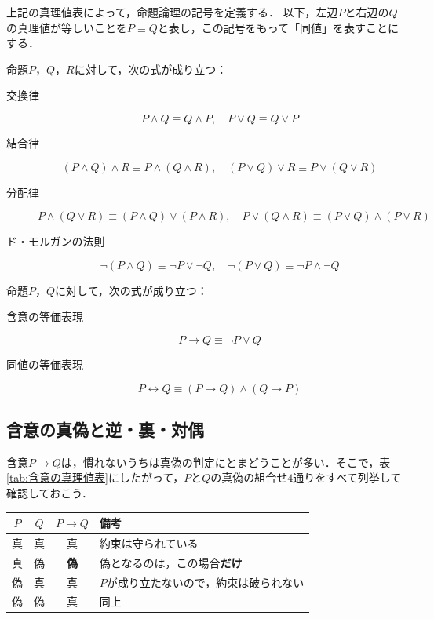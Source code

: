 上記の真理値表によって，命題論理の記号を定義する．
以下，左辺$P$と右辺の$Q$の真理値が等しいことを$P \equiv Q$と表し，この記号をもって「同値」を表すことにする．

\begin{prop}{}{}
  命題$P$，$Q$，$R$に対して，次の式が成り立つ：
  \begin{description}
    \item[交換律]
          \[
            P \land Q \equiv Q \land P,\quad
            P \lor Q \equiv Q \lor P
          \]
    \item[結合律]
          \[
            (P \land Q) \land R \equiv P \land (Q \land R),\quad
            (P \lor Q) \lor R \equiv P \lor (Q \lor R)
          \]
    \item[分配律]
          \[
            P \land (Q \lor R) \equiv (P \land Q) \lor (P \land R),\quad
            P \lor (Q \land R) \equiv (P \lor Q) \land (P \lor R)
          \]
    \item[ド・モルガンの法則]
          \[
            \lnot (P \land Q) \equiv \lnot P \lor \lnot Q,\quad
            \lnot (P \lor Q) \equiv \lnot P \land \lnot Q
          \]
  \end{description}
\end{prop}

\begin{prop}{}{}
  命題$P$，$Q$に対して，次の式が成り立つ：
  \begin{description}
    \item[含意の等価表現] 
          \[
            P \to Q \equiv \lnot P \lor Q
          \]
    \item[同値の等価表現]
          \[
            P \leftrightarrow Q \equiv (P \to Q) \land (Q \to P)
          \]
  \end{description}
\end{prop}

\subsection{含意の真偽と逆・裏・対偶}

含意$P \to Q$は，慣れないうちは真偽の判定にとまどうことが多い．そこで，表\ref{tab:含意の真理値表}にしたがって，$P$と$Q$の真偽の組合せ$4$通りをすべて列挙して確認しておこう．

\begin{center}
  \begin{tabular}{|c|c|c|l|} \hline
    $P$ & $Q$ & $P \to Q$   & 備考                                   \\ \hline
    真  & 真  & 真          & 約束は守られている                     \\ \hline
    真  & 偽  & \textbf{偽} & 偽となるのは，この場合\textbf{だけ}    \\ \hline
    偽  & 真  & 真          & $P$が成り立たないので，約束は破られない \\ \hline
    偽  & 偽  & 真          & 同上                                   \\ \hline
  \end{tabular}
\end{center}

